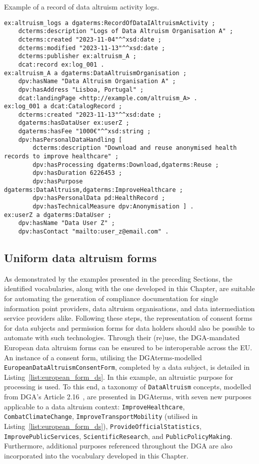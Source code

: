 \begin{listing}[ht]
\caption{Example of a record of data altruism activity logs.}
\label{list:activity_log}
\begin{verbatim}
ex:altruism_logs a dgaterms:RecordOfDataIAltruismActivity ;
    dcterms:description "Logs of Data Altruism Organisation A" ;
    dcterms:created "2023-11-04"^^xsd:date ; 
    dcterms:modified "2023-11-13"^^xsd:date ;
    dcterms:publisher ex:altruism_A ;
    dcat:record ex:log_001 .
ex:altruism_A a dgaterms:DataAltruismOrganisation ;
    dpv:hasName "Data Altruism Organisation A" ;
    dpv:hasAddress "Lisboa, Portugal" ;
    dcat:landingPage <http://example.com/altruism_A> .
ex:log_001 a dcat:CatalogRecord ;
    dcterms:created "2023-11-13"^^xsd:date ;
    dgaterms:hasDataUser ex:userZ ;
    dgaterms:hasFee "1000€"^^xsd:string ;
    dpv:hasPersonalDataHandling [
        dcterms:description "Download and reuse anonymised health records to improve healthcare" ;
        dpv:hasProcessing dgaterms:Download,dgaterms:Reuse ;
        dpv:hasDuration 6226453 ;
        dpv:hasPurpose dgaterms:DataAltruism,dgaterms:ImproveHealthcare ;
        dpv:hasPersonalData pd:HealthRecord ;
        dpv:hasTechnicalMeasure dpv:Anonymisation ] .
ex:userZ a dgaterms:DataUser ;
    dpv:hasName "Data User Z" ;
    dpv:hasContact "mailto:user_z@email.com" .
\end{verbatim}
\end{listing}

\subsection{Uniform data altruism forms}
\label{sec:dga_forms}

As demonstrated by the examples presented in the preceding Sections, the identified vocabularies, along with the one developed in this Chapter, are suitable for automating the generation of compliance documentation for single information point providers, data altruism organisations, and data intermediation service providers alike.
Following these steps, the representation of consent forms for data subjects and permission forms for data holders should also be possible to automate with such technologies.
Through their (re)use, the DGA-mandated European data altruism forms can be ensured to be interoperable across the EU.
An instance of a consent form, utilising the DGAterms-modelled \texttt{EuropeanDataAltruismConsentForm}, completed by a data subject, is detailed in Listing~\ref{list:european_form_ds}.
In this example, an altruistic purpose for processing is used.
To this end, a taxonomy of \texttt{DataAltruism} concepts, modelled from DGA's Article 2.16~\citeyearpar{noauthor_regulation_2022}, are presented in DGAterms, with seven new purposes applicable to a data altruism context: \texttt{ImproveHealthcare}, \texttt{CombatClimateChange}, \texttt{ImproveTransportMobility} (utilised in Listing~\ref{list:european_form_ds}), \texttt{ProvideOfficialStatistics}, \texttt{ImprovePublicServices}, \texttt{ScientificResearch}, and \texttt{PublicPolicyMaking}.
Furthermore, additional purposes referenced throughout the DGA are also incorporated into the vocabulary developed in this Chapter.

